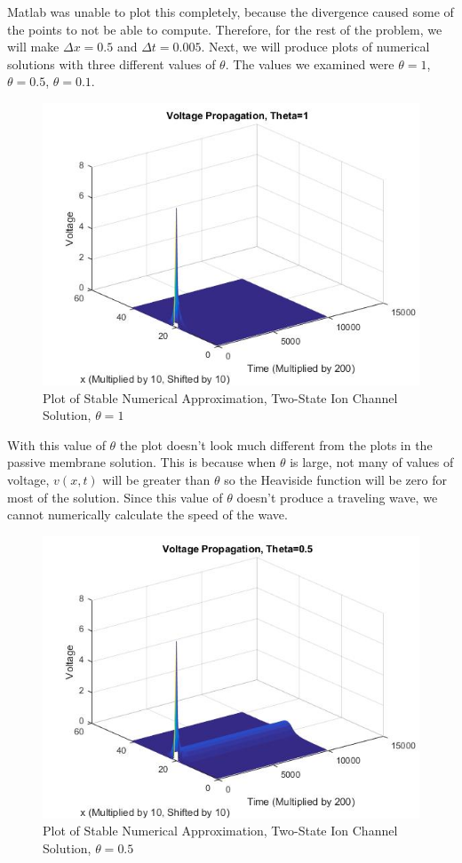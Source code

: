 \documentclass[12pt]{article}
\begin{document}
Matlab was unable to plot this completely, because the divergence caused some of the points to not be able to compute. Therefore, for the rest of the problem, we will make $\Delta{x}=0.5$ and $\Delta{t}=0.005$. Next, we will produce plots of numerical solutions with three different values of $\theta$. The values we examined were $\theta=1$, $\theta=0.5$, $\theta=0.1$. 
\begin{figure}[H]
  \includegraphics[width=\linewidth]{thetaone.jpg}
  \caption{Plot of Stable Numerical Approximation, Two-State Ion Channel Solution, $\theta=1$}
  \label{fig:sketch4}
\end{figure}
With this value of $\theta$ the plot doesn't look much different from the plots in the passive membrane solution. This is because when $\theta$ is large, not many of values of voltage, $v(x,t)$ will be greater than $\theta$ so the Heaviside function will be zero for most of the solution. Since this value of $\theta$ doesn't produce a traveling wave, we cannot numerically calculate the speed of the wave. 
\begin{figure}[H]
  \includegraphics[width=\linewidth]{thetatwo.jpg}
  \caption{Plot of Stable Numerical Approximation, Two-State Ion Channel Solution, $\theta=0.5$}
  \label{fig:sketch5}
\end{figure}
\end{document}
